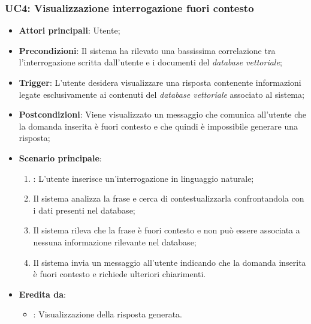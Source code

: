 \subsubsection{UC4: Visualizzazione interrogazione fuori contesto}
\begin{itemize}
    \item \textbf{Attori principali}: Utente;
    \item \textbf{Precondizioni}: Il sistema ha rilevato una bassissima correlazione tra l'interrogazione scritta dall'utente e i documenti del \emph{database vettoriale};
    \item \textbf{Trigger}: L'utente desidera visualizzare una risposta contenente informazioni legate esclusivamente ai contenuti del \emph{database vettoriale} associato al sistema;
    \item \textbf{Postcondizioni}: Viene visualizzato un messaggio che comunica all'utente che la domanda inserita è fuori contesto e che quindi è impossibile generare una risposta;
    \item \textbf{Scenario principale}:
    \begin{enumerate}
        \item {}: L'utente inserisce un'interrogazione in linguaggio naturale;
        \item Il sistema analizza la frase e cerca di contestualizzarla confrontandola con i dati presenti nel database;
        \item Il sistema rileva che la frase è fuori contesto e non può essere associata a nessuna informazione rilevante nel database;
        \item Il sistema invia un messaggio all'utente indicando che la domanda inserita è fuori contesto e richiede ulteriori chiarimenti.
    \end{enumerate}
    \item \textbf{Eredita da}:
    \begin{itemize}
        \item {}: Visualizzazione della risposta generata.
    \end{itemize}
\end{itemize}

\hypertarget{UC5}{}

